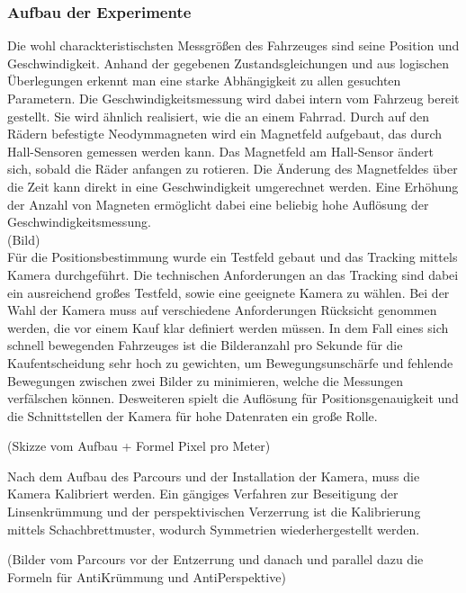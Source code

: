 \subsubsection{Aufbau der Experimente}
Die wohl charackteristischsten Messgrößen des Fahrzeuges sind seine Position und Geschwindigkeit. Anhand der gegebenen Zustandsgleichungen und aus logischen Überlegungen erkennt man eine starke Abhängigkeit zu allen gesuchten Parametern. Die Geschwindigkeitsmessung wird dabei intern vom Fahrzeug bereit gestellt. Sie wird ähnlich realisiert, wie die an einem Fahrrad. Durch auf den Rädern befestigte Neodymmagneten wird ein Magnetfeld aufgebaut, das durch Hall-Sensoren gemessen werden kann. Das Magnetfeld am Hall-Sensor ändert sich, sobald die Räder anfangen zu rotieren. Die Änderung des Magnetfeldes über die Zeit kann direkt in eine Geschwindigkeit umgerechnet werden. Eine Erhöhung der Anzahl von Magneten ermöglicht dabei eine beliebig hohe Auflösung der Geschwindigkeitsmessung. \\

(Bild)\\ 

Für die Positionsbestimmung wurde ein Testfeld gebaut und das Tracking mittels Kamera durchgeführt. Die technischen Anforderungen an das Tracking sind dabei ein ausreichend großes Testfeld, sowie eine geeignete Kamera zu wählen. Bei der Wahl der Kamera muss auf verschiedene Anforderungen Rücksicht genommen werden, die vor einem Kauf klar definiert werden müssen. In dem Fall eines sich schnell bewegenden Fahrzeuges ist die Bilderanzahl pro Sekunde für die Kaufentscheidung sehr hoch zu gewichten, um Bewegungsunschärfe und fehlende Bewegungen zwischen zwei Bilder zu minimieren, welche die Messungen verfälschen können. Desweiteren spielt die Auflösung für Positionsgenauigkeit und die Schnittstellen der Kamera für hohe Datenraten ein große Rolle. 

(Skizze vom Aufbau + Formel Pixel pro Meter)

Nach dem Aufbau des Parcours und der Installation der Kamera, muss die Kamera Kalibriert werden. Ein gängiges Verfahren zur Beseitigung der Linsenkrümmung und der perspektivischen Verzerrung ist die Kalibrierung mittels Schachbrettmuster, wodurch Symmetrien wiederhergestellt werden.  

(Bilder vom Parcours vor der Entzerrung und danach und parallel dazu die Formeln für AntiKrümmung und AntiPerspektive)

